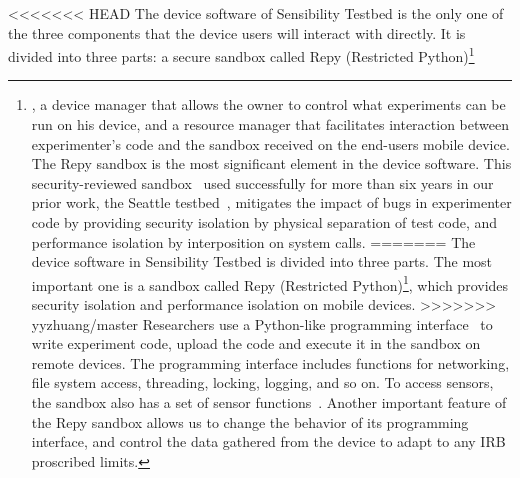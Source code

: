 {%
<<<<<<< HEAD
The device software of Sensibility Testbed is the only one of the three components that the device users will interact with directly. It is divided into three parts: a secure sandbox called Repy (Restricted Python)\footnote{\scriptsize, a device manager that allows the owner to control what experiments can be run on his device, and a resource manager that facilitates interaction between experimenter's code and the sandbox received on the end-users mobile device.
The Repy sandbox is the most significant element in the device software. This security-reviewed sandbox~\cite{cappos2010retaining} used successfully for more than six years in our 
prior work, the Seattle testbed~\cite{seattle}, mitigates the impact of bugs in experimenter code by providing security isolation by physical separation of test code, and performance isolation by interposition on system calls. 
=======
The device software in Sensibility Testbed is divided into three parts. 
The most important one is a sandbox called Repy (Restricted 
Python)\footnote{\scriptsize This is the 
same security-reviewed sandbox~\cite{cappos2010retaining} used in
our prior work, the Seattle testbed~\cite{seattle}. This sandbox
mitigates the impact of bugs in experimenter code.}, which 
provides security isolation and performance isolation on mobile devices.
>>>>>>> yyzhuang/master
Researchers use a Python-like programming interface~\cite{repyv2}
to write experiment code, upload the code and execute it in the
sandbox on remote devices. The programming interface includes functions for networking, 
file system access, threading, locking, logging, and so on. To access sensors, 
the sandbox also has a set of sensor functions~\cite{sensors}. 
%
Another important feature of the Repy sandbox allows us to change the 
behavior of its programming interface, and control the 
data gathered from the device to adapt to any IRB proscribed limits. 
}}
